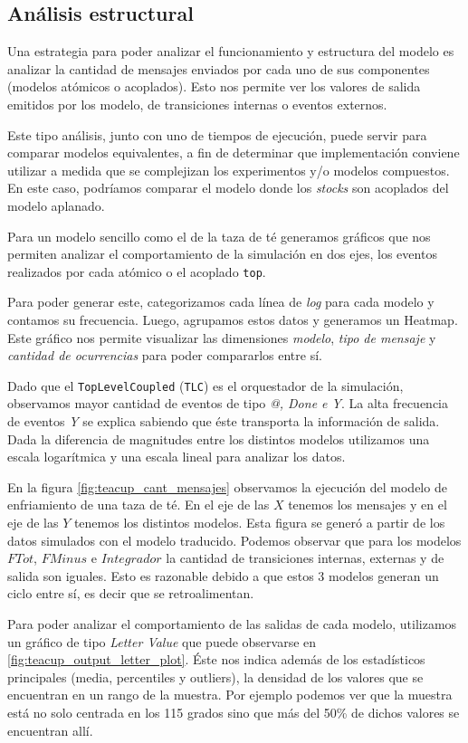 \subsection{Análisis estructural}
Una estrategia para poder analizar el funcionamiento y estructura del modelo es analizar la
cantidad de mensajes enviados por cada uno de sus componentes (modelos atómicos o acoplados). 
Esto nos permite ver los valores de salida emitidos por los modelo, de transiciones internas o eventos
externos.

Este tipo análisis, junto con uno de tiempos de ejecución, puede servir para comparar modelos equivalentes, a fin de determinar que implementación conviene utilizar a medida que se complejizan los experimentos y/o modelos compuestos. En este caso, podríamos comparar el modelo donde los \textit{stocks} son acoplados del modelo aplanado.

Para un modelo sencillo como el de la taza de té generamos gráficos que nos
permiten analizar el comportamiento de la simulación en dos ejes, los eventos
realizados por cada atómico o el acoplado \texttt{top}.

Para poder generar este, categorizamos cada línea de \textit{log} para cada modelo y
contamos su frecuencia. Luego, agrupamos estos datos y generamos un Heatmap.
Este gráfico nos permite visualizar las dimensiones \textit{modelo}, \textit{tipo de mensaje} y
\textit{cantidad de ocurrencias} para poder compararlos entre sí.

Dado que el \texttt{TopLevelCoupled} (\texttt{TLC})  es el orquestador de la simulación,
observamos mayor cantidad de eventos de tipo \textit{@, Done e Y}. La alta
frecuencia de eventos \textit{Y} se explica sabiendo que éste  transporta la
información de salida. Dada la diferencia de magnitudes entre los distintos
modelos utilizamos una escala logarítmica y una escala lineal para analizar los
datos.

En la figura \ref{fig:teacup_cant_mensajes} observamos la  ejecución del modelo
de enfriamiento de una taza de té. En el eje de las $X$ tenemos los mensajes 
y en el eje de las $Y$ tenemos los distintos modelos. 
Esta figura se generó a partir de los datos simulados con el modelo traducido.
Podemos observar que para los modelos $FTot$, $FMinus$ e $Integrador$ la cantidad 
de transiciones internas, externas y de salida son iguales. Esto es razonable 
debido a que estos 3 modelos generan un ciclo entre sí, es decir que se retroalimentan.

Para poder analizar el comportamiento de las salidas de cada modelo, utilizamos
un gráfico de tipo \textit{Letter Value} que puede observarse en \ref{fig:teacup_output_letter_plot}.
Éste nos indica además de los estadísticos principales (media, percentiles y outliers), 
la densidad de los valores que se encuentran en un rango de la muestra. 
Por ejemplo podemos ver que la muestra está no solo centrada en los 115 grados sino que 
más del 50\% de dichos valores se encuentran allí. 

